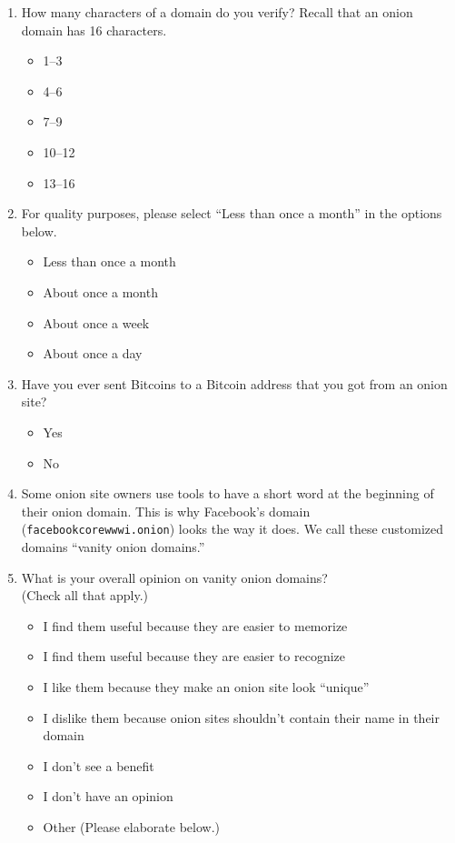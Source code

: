 \begin{enumerate}
    \item How many characters of a domain do you verify? Recall that an onion
        domain has 16 characters.
        \begin{itemize}[label=$\Circle$]
            \item 1--3
            \item 4--6
            \item 7--9
            \item 10--12
            \item 13--16
        \end{itemize}

    \item For quality purposes, please select ``Less than once a month'' in the
        options below.
        \begin{itemize}[label=$\Circle$]
            \item Less than once a month
            \item About once a month
            \item About once a week
            \item About once a day
        \end{itemize}

    \item Have you ever sent Bitcoins to a Bitcoin address that you got from an
        onion site?
        \begin{itemize}[label=$\Circle$]
            \item Yes
            \item No
        \end{itemize}

    \item Some onion site owners use tools to have a short word at the
        beginning of their onion domain. This is why Facebook's domain
        (\texttt{facebookcorewwwi.onion}) looks the way it does. We call these
        customized domains ``vanity onion domains.''

    \item What is your overall opinion on vanity onion domains?\\(Check all
        that apply.)
        \begin{itemize}[label=$\Square$]
            \item I find them useful because they are easier to memorize
            \item I find them useful because they are easier to recognize
            \item I like them because they make an onion site look ``unique''
            \item I dislike them because onion sites shouldn't contain their
                name in their domain
            \item I don't see a benefit
            \item I don't have an opinion
            \item Other (Please elaborate below.)
        \end{itemize}
\end{enumerate}

